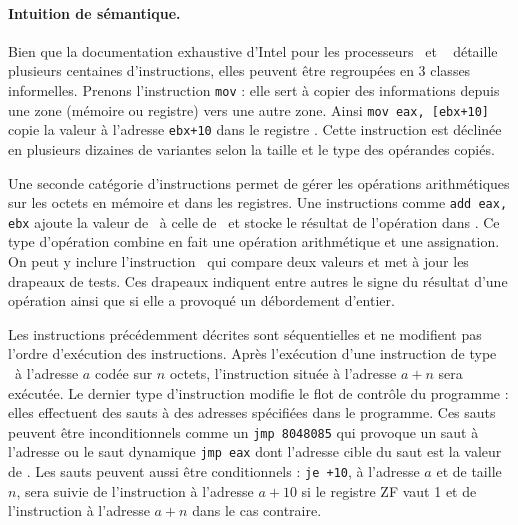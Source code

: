 \paragraph{Intuition de sémantique.}
Bien que la documentation exhaustive d'Intel pour les processeurs \xq\ et \xs\ \cite{intel_vol2} détaille plusieurs centaines d'instructions, elles peuvent être regroupées en 3 classes informelles.
Prenons l'instruction \texttt{mov} : elle sert à copier des informations depuis une zone (mémoire ou registre) vers une autre zone.
Ainsi \texttt{mov eax, [ebx+10]} copie la valeur à l'adresse \texttt{ebx+10} dans le registre \eax. 
Cette instruction est déclinée en plusieurs dizaines de variantes selon la taille et le type des opérandes copiés.

Une seconde catégorie d'instructions permet de gérer les opérations arithmétiques sur les octets en mémoire et dans les registres.
Une instructions comme \texttt{add eax, ebx} ajoute la valeur de \ebx\ à celle de \eax\ et stocke le résultat de l'opération dans \eax.
Ce type d'opération combine en fait une opération arithmétique et une assignation. 
On peut y inclure l'instruction \cmp\ qui compare deux valeurs et met à jour les drapeaux de tests. 
Ces drapeaux indiquent entre autres le signe du résultat d'une opération ainsi que si elle a provoqué un débordement d'entier.

Les instructions précédemment décrites sont séquentielles et ne modifient pas l'ordre d'exécution des instructions. 
Après l'exécution d'une instruction de type \mov\ à l'adresse $a$ codée sur $n$ octets, l'instruction située à l'adresse $a+n$ sera exécutée.
Le dernier type d'instruction modifie le flot de contrôle du programme : elles effectuent des sauts à des adresses spécifiées dans le programme.
Ces sauts peuvent être inconditionnels comme un \texttt{jmp 8048085} qui provoque un saut à l'adresse  ou le saut dynamique \texttt{jmp eax} dont l'adresse cible du saut est la valeur de \eax.
Les sauts peuvent aussi être conditionnels : \texttt{je~+10}, à l'adresse $a$ et de taille $n$, sera suivie de l'instruction à l'adresse $a+10$ si le registre ZF vaut 1 et de l'instruction à l'adresse $a+n$ dans le cas contraire.




